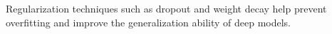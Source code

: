 Regularization techniques such as dropout and weight decay help prevent overfitting and improve the generalization ability of deep models.
